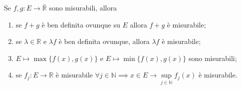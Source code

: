 \begin{prop}
	Se $f, g: E \to \bar{\mathbb{R}}$ sono misurabili, allora
	\begin{enumerate}[label=\protect\circled{\arabic*}]
		\item se $f+g$ è ben definita ovunque su $E$ allora $f+g$ è misurabile;
		\item se $\lambda \in \mathbb{R}$ e $\lambda f$ è ben definita ovunque, allora $\lambda f$ è misurabile;
		\item $E \mapsto \max\{f(x), g(x) \}$ e $E \mapsto \min\{f(x),g(x) \}$ sono misurabili;
		\item se $f_j: E \to \mathbb{R}$ è misurabile $\forall j \in \mathbb{N} \implies x \in E \to \sup\limits_{j \in \mathbb{N}} f_j(x)$ è misurabile.
	\end{enumerate}
	\label{prop:f_g_mis}
\end{prop}
